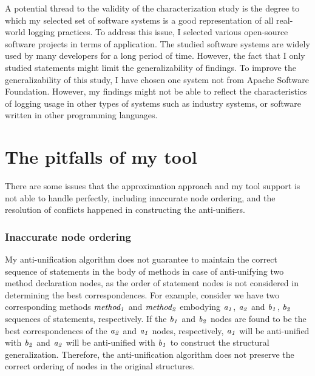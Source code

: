 

A potential thread to the validity of the characterization study is the degree to which my selected set of software systems is a good representation of all real-world logging practices. To address this issue, I selected various open-source software projects in terms of application. The studied software systems are widely used by many developers for a long period of time.  However, the fact that I only studied  statements might limit the generalizability of findings. To improve the generalizability of this study, I have chosen one system not from Apache Software Foundation. However, my findings might not be able to reflect the characteristics of logging usage in other types of systems such as industry systems, or software written in other programming languages.



\section{The pitfalls of my tool}  \label{limitations}
There are some issues that the approximation approach and my tool support is not able to handle perfectly, including inaccurate node ordering, and the resolution of conflicts happened in constructing the anti-unifiers.


\subsubsection{Inaccurate node ordering}  \label{mismatch}
My anti-unification algorithm does not guarantee to maintain the correct sequence of statements in the body of methods in case of anti-unifying two method declaration nodes, as the order of statement nodes is not considered in determining the best correspondences. For example, consider we have two corresponding methods $\mathit{method_1}$ and $\mathit{method_2}$ embodying {$\mathit{a_1}$, $\mathit{a_2}$} and {$\mathit{b_1}$, $\mathit{b_2}$} sequences of statements, respectively. If the $\mathit{b_1}$ and $\mathit{b_2}$ nodes are found to be the best correspondences of the $\mathit{a_2}$ and $\mathit{a_1}$ nodes, respectively, $\mathit{a_1}$ will be anti-unified with $\mathit{b_2}$  and $\mathit{a_2}$ will be anti-unified with $\mathit{b_1}$ to construct the structural generalization. Therefore, the anti-unification algorithm does not preserve the correct ordering of nodes in the original structures.

